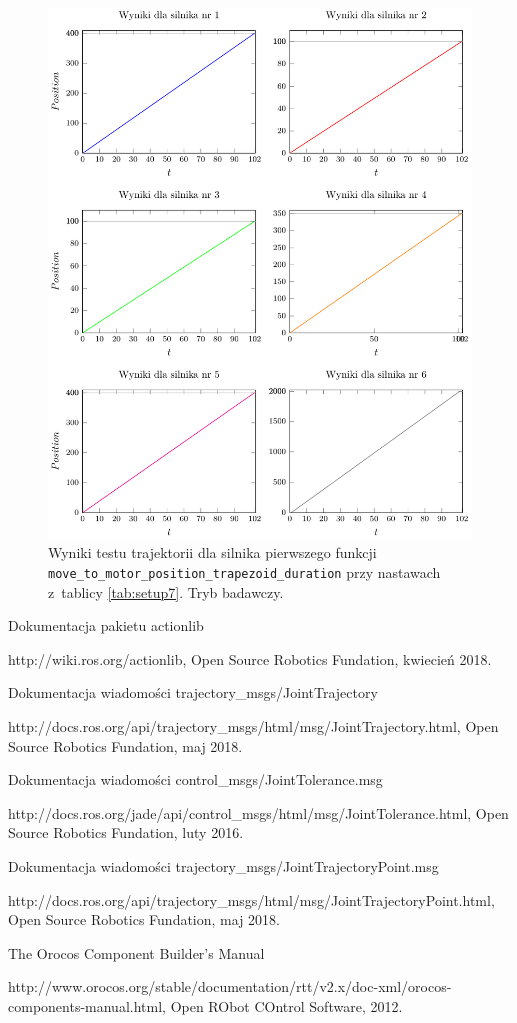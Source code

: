 \documentclass[a4paper, 12pt]{article}
\begin{document}
	\begin{figure}[H]
		\centering
		\includegraphics[scale=1.1]{raport_graphs/simpMPDRall.pdf}
		\caption{Wyniki testu trajektorii dla silnika pierwszego funkcji \texttt{move\_to\_motor\_position\_trapezoid\_duration} przy nastawach z~tablicy \ref{tab:setup7}. Tryb badawczy.}
		\label{fig:simpMPDRall}
	\end{figure}	
	
	
\newpage	
\begin{thebibliography}{9}
Dokumentacja pakietu actionlib

http://wiki.ros.org/actionlib, Open Source Robotics Fundation, kwiecień 2018.

Dokumentacja wiadomości trajectory\_msgs/JointTrajectory

http://docs.ros.org/api/trajectory\_msgs/html/msg/JointTrajectory.html, Open Source Robotics Fundation, maj 2018.

Dokumentacja wiadomości control\_msgs/JointTolerance.msg

http://docs.ros.org/jade/api/control\_msgs/html/msg/JointTolerance.html, Open Source Robotics Fundation, luty 2016.

Dokumentacja wiadomości trajectory\_msgs/JointTrajectoryPoint.msg

http://docs.ros.org/api/trajectory\_msgs/html/msg/JointTrajectoryPoint.html, Open Source Robotics Fundation, maj 2018.

The Orocos Component Builder's Manual

 http://www.orocos.org/stable/documentation/rtt/v2.x/doc-xml/orocos-components-manual.html, Open RObot COntrol Software, 2012.
\end{thebibliography}	
	
\end{document}
